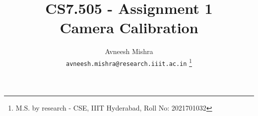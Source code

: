 

{
   \fancyhf{}
   \renewcommand{\headrulewidth}{0pt} %
}

\title{CS7.505 - Assignment 1 \\
    \Large Camera Calibration}

\author{
    Avneesh Mishra \\
    \texttt{avneesh.mishra@research.iiit.ac.in}
    \thanks{M.S. by research - CSE, IIIT Hyderabad, Roll No: 2021701032}
}


    \maketitle
    \thispagestyle{fancy_tr_rno}
    \tableofcontents

    \pagebreak
    
    \pagebreak
    
    \pagebreak
    
    \pagebreak
    
    \pagebreak
    
    \pagebreak
    
    \pagebreak
    
    \pagebreak
    
    \pagebreak
    
    
    \pagebreak
    \printbibliography

